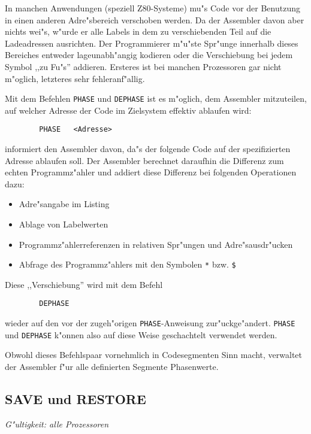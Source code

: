 \documentclass[12pt,a4paper,twoside]{report}
\makeatletter
\newcommand{\tty}[1]{{\tt #1}}
\newcommand{\ttindex}[1]{\index{#1@{\tt #1}}}
\makeatother
\begin{document}
In manchen Anwendungen (speziell Z80-Systeme) mu"s Code vor der
Benutzung in einen anderen Adre"sbereich verschoben werden.  Da der
Assembler davon aber nichts wei"s, w"urde er alle Labels in dem zu
verschiebenden Teil auf die Ladeadressen ausrichten.  Der Programmierer
m"u"ste Spr"unge innerhalb dieses Bereiches entweder lageunabh"angig
kodieren oder die Verschiebung bei jedem Symbol ,,zu Fu"s'' addieren.
Ersteres ist bei manchen Prozessoren gar nicht m"oglich, letzteres sehr
fehleranf"allig.
\par
Mit dem Befehlen \tty{PHASE} und \tty{DEPHASE} ist es m"oglich, dem
Assembler mitzuteilen, auf welcher Adresse der Code im Zielsystem
effektiv ablaufen wird:
\begin{verbatim}
        PHASE   <Adresse>
\end{verbatim}
informiert den Assembler davon, da"s der folgende Code auf der
spezifizierten Adresse ablaufen soll.  Der Assembler berechnet
daraufhin die Differenz zum echten Programmz"ahler und addiert diese
Differenz bei folgenden Operationen dazu:
\begin{itemize}
\item{Adre"sangabe im Listing}
\item{Ablage von Labelwerten}
\item{Programmz"ahlerreferenzen in relativen Spr"ungen und
      Adre"sausdr"ucken}
\item{Abfrage des Programmz"ahlers mit den Symbolen \verb!*! bzw. \verb!$!}
\end{itemize}
Diese ,,Verschiebung'' wird mit dem Befehl
\begin{verbatim}
        DEPHASE
\end{verbatim}
wieder auf den vor der zugeh"origen \tty{PHASE}-Anweisung zur"uckge"andert.
\tty{PHASE} und \tty{DEPHASE} k"onnen also auf diese Weise geschachtelt
verwendet werden.
\par
Obwohl dieses Befehlspaar vornehmlich in Codesegmenten Sinn macht,
verwaltet der Assembler f"ur alle definierten Segmente Phasenwerte.


\subsection{SAVE und RESTORE}
\ttindex{SAVE}\ttindex{RESTORE}

{\em G"ultigkeit: alle Prozessoren}
\end{document}
